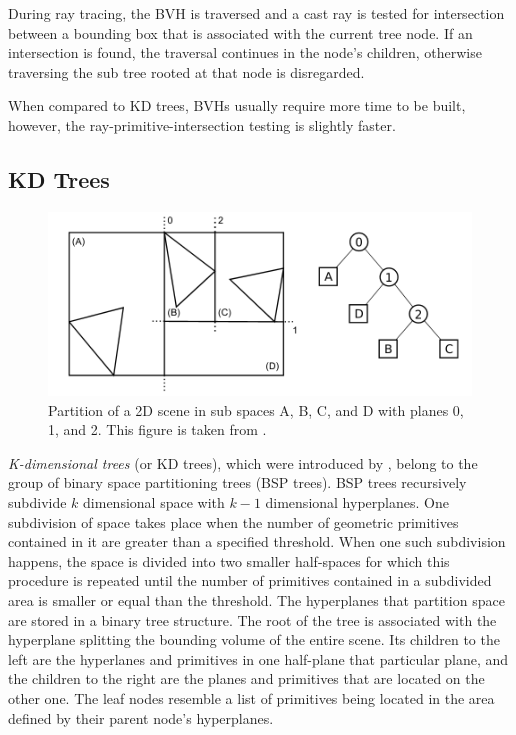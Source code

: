 During ray tracing, the BVH is traversed and a cast ray is tested for intersection between a bounding box that is associated with the current tree node. If an intersection is found, the traversal continues in the node's children, otherwise traversing the sub tree rooted at that node is disregarded.

When compared to KD trees, BVHs usually require more time to be built, however, the ray-primitive-intersection testing is slightly faster. 

\subsection{KD Trees}

\begin{figure}
	\centering
	\includegraphics[width=1\linewidth]{img/1 fundamentals/kd_tree.png}
	\caption{Partition of a 2D scene in sub spaces A, B, C, and D with planes 0, 1, and 2. This figure is taken from \cite{hapala2011kd}.}
	\label{fig:kdtree}
\end{figure}

\emph{K-dimensional trees} (or KD trees), which were introduced by \cite{bentley1975multidimensional}, belong to the group of binary space partitioning trees (BSP trees). BSP trees recursively subdivide $k$ dimensional space with $k-1$ dimensional hyperplanes. One subdivision of space takes place when the number of geometric primitives contained in it are greater than a specified threshold. When one such subdivision happens, the space is divided into two smaller half-spaces for which this procedure is repeated until the number of primitives contained in a subdivided area is smaller or equal than the threshold. The hyperplanes that partition space are stored in a binary tree structure. The root of the tree is associated with the hyperplane splitting the bounding volume of the entire scene. Its children to the left are the hyperlanes and primitives in one half-plane that particular plane, and the children to the right are the planes and primitives that are located on the other one. The leaf nodes resemble a list of primitives being located in the area defined by their parent node's hyperplanes.

